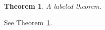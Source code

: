 \documentclass{article}
\newtheorem{theorem}{Theorem}
\begin{document}
\begin{theorem}\label{thm:one}
A labeled theorem.
\end{theorem}

See Theorem~\ref{thm:one}.
\end{document}
